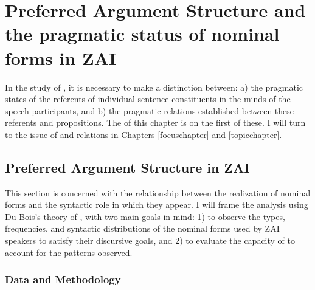 \chapter{Preferred Argument Structure and the pragmatic status of nominal forms in ZAI}\label{paschapter}

In the study of , it is necessary to make a distinction between: a) the pragmatic states of the referents of individual sentence constituents in the minds of the speech participants, and b) the pragmatic relations established between these referents and propositions. The  of this chapter is on the first of these. I will turn to the issue of  and  relations in Chapters \ref{focuschapter} and \ref{topicchapter}.



\section{Preferred Argument Structure in ZAI}\label{pasinzai}

This section is concerned with the relationship between the realization of nominal forms and the syntactic role in which they appear. I will frame the analysis using Du Bois's theory of  \citep{dubois1987,dubois2003,dubois2003a,dubois2003b}, with two main goals in mind: 1) to observe the types, frequencies, and syntactic distributions of the nominal forms used by ZAI speakers to satisfy their discursive goals, and 2) to evaluate the capacity of  to account for the patterns observed.


\subsection{Data and Methodology}\label{data}

